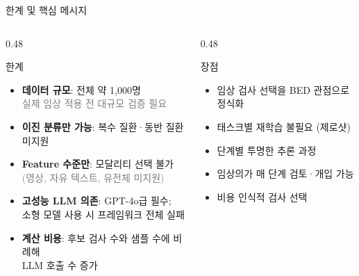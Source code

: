 \documentclass[
11pt,notheorems,hyperref={pdfauthor=whatever}
]{beamer}
\begin{document}
\begin{frame}{한계 및 핵심 메시지}
\begin{columns}[c]

\begin{column}{0.48\textwidth}

    \begin{alertblock}{한계}
    \footnotesize
    \begin{itemize}\itemsep0.4em
        \item \textbf{데이터 규모}: 전체 약 1,000명\\
              \textcolor{gray}{실제 임상 적용 전 대규모 검증 필요}
        \item \textbf{이진 분류만 가능}: 복수 질환·동반 질환 미지원
        \item \textbf{Feature 수준만}: 모달리티 선택 불가\\
              \textcolor{gray}{(영상, 자유 텍스트, 유전체 미지원)}
        \item \textbf{고성능 LLM 의존}: GPT-4o급 필수;\\
              소형 모델 사용 시 프레임워크 전체 실패
        \item \textbf{계산 비용}: 후보 검사 수와 샘플 수에 비례해\\
              LLM 호출 수 증가
    \end{itemize}
    \end{alertblock}

\end{column}

\begin{column}{0.48\textwidth}

    \begin{block}{장점}
    \footnotesize
    \begin{itemize}\itemsep0.3em
        \item 임상 검사 선택을 BED 관점으로 정식화
        \item 태스크별 재학습 불필요 (제로샷)
        \item 단계별 투명한 추론 과정
        \item 임상의가 매 단계 검토·개입 가능
        \item 비용 인식적 검사 선택
    \end{itemize}
    \end{block}


\end{column}
\end{columns}
\end{frame}
\end{document}
